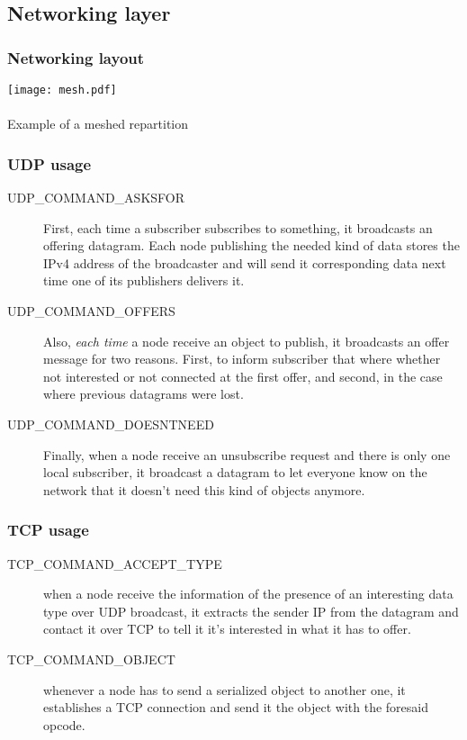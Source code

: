 \documentclass{beamer}
\begin{document}
\subsection{Networking layer}
\subsubsection{Networking layout}
\begin{frame}
\begin{center}
\texttt{[image: mesh.pdf]} \\~\vspace{0.5cm}\\
{Example of a meshed repartition}
\end{center}
\end{frame}

\subsubsection{UDP usage}
\begin{frame}
  \begin{description}
  \item[UDP\_COMMAND\_ASKSFOR]
    First, each time a subscriber subscribes to something, it broadcasts an offering datagram. Each node publishing the needed kind of data stores the IPv4 address of the broadcaster and will send it corresponding data next time one of its publishers delivers it.
\pause
  \item[UDP\_COMMAND\_OFFERS]
    Also, \emph{each time} a node receive an object to publish, it broadcasts
    an offer message for two reasons. First, to inform subscriber that where whether not interested or not connected at
    the first offer, and second, in the case where previous datagrams were lost.
\pause
  \item[UDP\_COMMAND\_DOESNTNEED]
    Finally, when a node receive an unsubscribe request and there is only
    one local subscriber, it broadcast a datagram to let everyone know on the network that it doesn't need this kind of
    objects anymore.
  \end{description}
\end{frame}

\subsubsection{TCP usage}
\begin{frame}
  \begin{description}
  \item[TCP\_COMMAND\_ACCEPT\_TYPE]
    when a node receive the information of the presence of an interesting data type over UDP broadcast, it extracts the sender IP from the datagram and contact it over TCP to tell it it's interested in what it has to offer.
\pause
  \item[TCP\_COMMAND\_OBJECT ]
    whenever a node has to send a serialized object to another one, it establishes a TCP connection and send it the object with the foresaid opcode.
  \end{description}
\end{frame}
\end{document}

